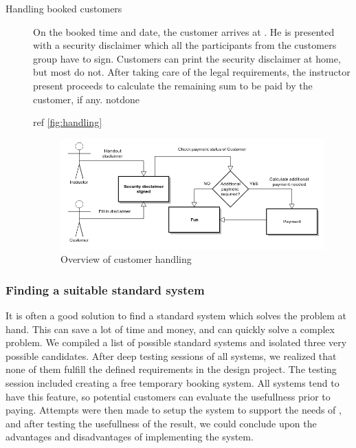 \begin{description}
\item[Handling booked customers]
On the booked time and date, the customer arrives at \gomonkey{}. He is presented with a security disclaimer
which all the participants from the customers group have to sign. Customers can print the security disclaimer 
at home, but most do not. After taking care of the legal requirements, the instructor present proceeds to
calculate the remaining sum to be paid by the customer, if any. notdone

ref \autoref{fig:handling}

\begin{figure}[htbp]
    \centering
        \includegraphics[width=\textwidth]{figures/handling.png}
            \caption{Overview of customer handling}
        \label{fig:handling}
\end{figure}
\end{description}

\subsubsection{Finding a suitable standard system}
It is often a good solution to find a standard system which solves the problem 
at hand. This can save a lot of time and money, and can quickly solve a complex
problem.
We compiled a list of possible standard systems and isolated three very possible
candidates. After deep testing sessions of all systems, we realized that none
of them fulfill the defined requirements in the design project. The testing
session included creating a free temporary booking system. All systems tend to 
have this feature, so potential customers can evaluate the usefullness prior to 
paying. Attempts were then made to setup the system to support the needs of
\gomonkey{}, and after testing the usefullness of the result, we could conclude
upon the advantages and disadvantages of implementing the system.


